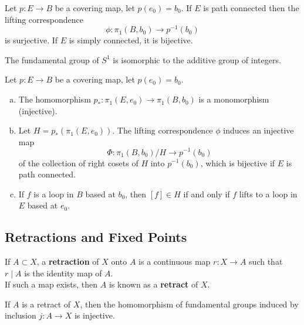 \begin{theorem}\label{lifting_surj}
Let $p\colon E \rightarrow B$ be a covering map, let $p(e_0) = b_0$. If $E$ is path connected then the lifting correspondence 
\[
    \phi\colon \pi _1(B, b_0) \rightarrow p^{-1}(b_0)
\]
is surjective. If $E$ is simply connected, it is bijective.
\end{theorem}

\begin{theorem}
The fundamental group of $S^1$ is isomorphic to the additive group of integers.
\end{theorem}

\begin{theorem}
Let $p\colon E \rightarrow B$ be a covering map, let $p(e_0) = b_0$.
\begin{enumerate}[a)]
    \item The homomorphism $p_{\ast} \colon \pi _1(E, e_0) \rightarrow \pi _1(B, b_0)$ is a monomorphism (injective).
    \item Let $H = p_{\ast} (\pi _1(E, e_0))$. The lifting correspondence $\phi$ induces an injective map
    \[
        \Phi\colon \pi _1(B, b_0) / H \rightarrow p^{-1}(b_0)
    \]
    of the collection of right cosets of $H$ into $p^{-1}(b_0)$, which is bijective if $E$ is path connected.
    \item If $f$ is a loop in $B$ based at $b_0$, then $[f] \in H$ if and only if $f$ lifts to a loop in $E$ based at $e_0$.
\end{enumerate}
\end{theorem}


\subsection{Retractions and Fixed Points}

\begin{definition}
If $A \subset X$, a \textbf{retraction} of $X$ onto $A$ is a continuous map $r\colon X \rightarrow  A$ such that $r \mid A$ is the identity map of $A$. \\

If such a map exists, then $A$ is known as a \textbf{retract} of $X$.
\end{definition}

\begin{lemma}
If $A$ is a retract of $X$, then the homomorphism of fundamental groups induced by inclusion $j\colon A \rightarrow X$ is injective.
\end{lemma}

